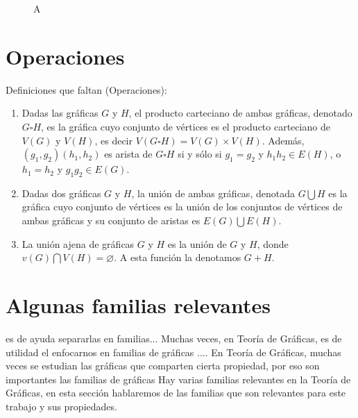 \begin{figure}[htb!]
    \caption{A}
    \label{fig:ex-caminos}
\end{figure}

\section{Operaciones}
\label{sec:operaciones}

\begin{definicion} Definiciones que faltan (Operaciones):
\begin{enumerate}
    \item Dadas las gr\'aficas $G$ y $H$, el producto carteciano de ambas
    gr\'aficas, denotado $G \square H$, es la gr\'afica cuyo conjunto de
    v\'ertices es el producto carteciano de $V(G)$ y $V(H)$, es decir $V(G
    \square H) = V(G) \times V(H)$. Adem\'as, $(g_1,g_2)(h_1,h_2)$ es arista
    de $G \square H$ si y s\'olo si $g_1 = g_2$ y $h_1h_2 \in E(H)$, o $h_1
    = h_2$ y $g_1g_2 \in E(G)$.
    \item Dadas dos gr\'aficas $G$ y $H$, la uni\'on de ambas gr\'aficas,
    denotada $G \bigcup H$ es la gr\'afica cuyo conjunto de v\'ertices es la
    uni\'on de los conjuntos de v\'ertices de ambas gr\'aficas y su conjunto
    de aristas es $E(G) \bigcup E(H)$. 
    \item La uni\'on ajena de gr\'aficas $G$ y $H$ es la uni\'on de $G$ y
    $H$, donde $v(G) \bigcap V(H) = \varnothing$. A esta funci\'on la
    denotamos $G + H$. 
\end{enumerate}
\end{definicion}


\section{Algunas familias relevantes}
\label{sec:famGraf}
    
 es de ayuda
separarlas en familias... Muchas veces, en Teor\'ia de Gr\'aficas, es de utilidad
el enfocarnos en familias de gr\'aficas .... En
Teor\'ia de Gr\'aficas, muchas veces se estudian las gr\'aficas que comparten
cierta propiedad, por eso son importantes las familias de gr\'aficas     
Hay varias familias relevantes en la Teor\'ia de Gr\'aficas, en esta
    secci\'on hablaremos de las familias que son relevantes para este trabajo y
    sus propiedades.

